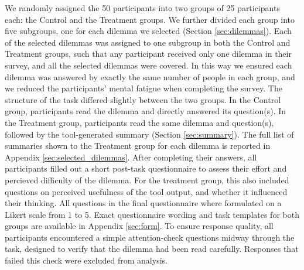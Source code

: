 We randomly assigned the 50 participants into two groups of 25 participants each: the Control and the Treatment groups.
We further divided each group into five subgroups, one for each dilemma we selected (Section \ref{sec:dilemmas}).
Each of the selected dilemmas was assigned to one subgroup in both the Control and Treatment groups, such that any participant received only one dilemma in their survey, and all the selected dilemmas were covered.
In this way we ensured each dilemma was answered by exactly the same number of people in each group, and we reduced the participants' mental fatigue when completing the survey.
The structure of the task differed slightly between the two groups.
In the Control group, participants read the dilemma and directly answered its question(s).
In the Treatment group, participants read the same dilemma and question(s), followed by the tool-generated summary (Section \ref{sec:summary}).
The full list of summaries shown to the Treatment group for each dilemma is reported in Appendix \ref{sec:selected_dilemmas}.
After completing their answers, all participants filled out a short post-task questionnaire to assess their effort and percieved difficulty of the dilemma.
For the treatment group, this also included questions on perceived usefulness of the tool output, and whether it influenced their thinking.
All questions in the final questionnaire where formulated on a Likert scale from 1 to 5.
Exact questionnaire wording and task templates for both groups are available in Appendix \ref{sec:form}.
To ensure response quality, all participants encountered a simple attention-check questions midway through the task, designed to verify that the dilemma had been read carefully. Responses that failed this check were excluded from analysis.

